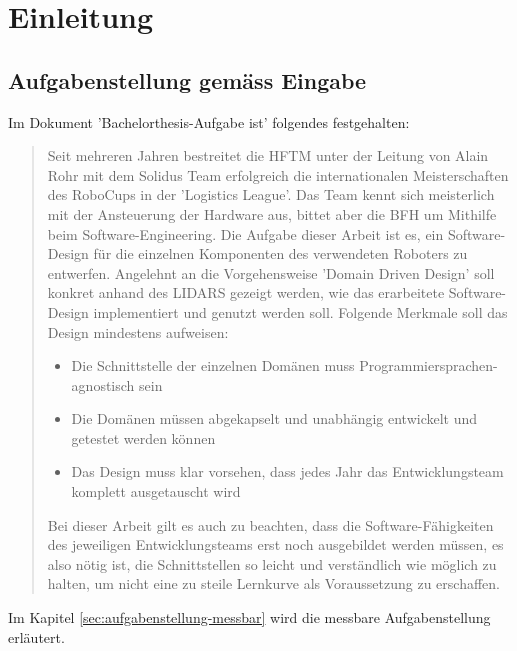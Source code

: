\chapter{Einleitung}
\section{Aufgabenstellung gemäss Eingabe}
\label{chap:aufgabenstellung}
Im Dokument 'Bachelorthesis-Aufgabe ist' folgendes festgehalten:
\begin{quote}
Seit mehreren Jahren bestreitet die HFTM unter der Leitung von Alain Rohr mit dem Solidus Team erfolgreich die internationalen Meisterschaften des RoboCups in der 'Logistics League'.
Das Team kennt sich meisterlich mit der Ansteuerung der Hardware aus, bittet aber die BFH um Mithilfe beim Software-Engineering.
Die Aufgabe dieser Arbeit ist es, ein Software-Design für die einzelnen Komponenten des verwendeten Roboters zu entwerfen. Angelehnt an die Vorgehensweise 'Domain Driven Design' soll konkret anhand des LIDARS gezeigt werden, wie das erarbeitete Software-Design implementiert und genutzt werden soll. Folgende Merkmale soll das Design mindestens aufweisen:

\begin{itemize}
	\item Die Schnittstelle der einzelnen Domänen muss Programmiersprachen-agnostisch sein
	\item Die Domänen müssen abgekapselt und unabhängig entwickelt und getestet werden können
	\item Das Design muss klar vorsehen, dass jedes Jahr das Entwicklungsteam komplett ausgetauscht wird
\end{itemize}
Bei dieser Arbeit gilt es auch zu beachten, dass die Software-Fähigkeiten des jeweiligen Entwicklungsteams erst noch ausgebildet werden müssen, es also nötig ist, die Schnittstellen so leicht und verständlich wie möglich zu halten, um nicht eine zu steile Lernkurve als Voraussetzung zu erschaffen.
\end{quote}
Im Kapitel \ref{sec:aufgabenstellung-messbar} wird die messbare Aufgabenstellung erläutert.

